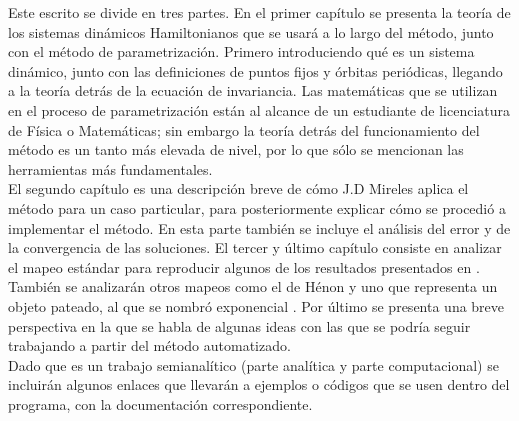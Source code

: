 Este escrito se divide en tres partes. En el primer capítulo se presenta la teoría de los sistemas dinámicos Hamiltonianos que se usará a lo largo del método, junto con el método de parametrización. Primero introduciendo qué es un sistema dinámico, junto con las definiciones de puntos fijos y órbitas periódicas, llegando a la teoría detrás de la ecuación de invariancia. Las matemáticas que se utilizan en el proceso de parametrización están al alcance de un estudiante de licenciatura de Física o Ma\-te\-má\-ti\-cas; sin embargo la teoría detrás del funcionamiento del método es un tanto más elevada de nivel, por lo que sólo se mencionan las herramientas más fundamentales.  \\


El segundo capítulo es una descripción breve de cómo J.D Mireles aplica el método para un caso particular, para posteriormente explicar cómo se procedió a implementar el método. En esta parte también se incluye el análisis del error y de la convergencia de las soluciones. El tercer y último capítulo consiste en analizar el mapeo estándar para reproducir algunos de los resultados presentados en \cite{Mireles}. También se analizarán otros mapeos como el de Hénon y uno que representa un objeto pateado, al que se nombró exponencial \cite{Jung}. Por último se presenta una breve perspectiva en la que se habla de algunas ideas con las que se podría seguir trabajando a partir del método automatizado. \\

Dado que es un trabajo semianalítico (parte analítica y parte computacional) se incluirán algunos enlaces que llevarán a ejemplos o códigos que se usen dentro del programa, con la documentación correspondiente. 

